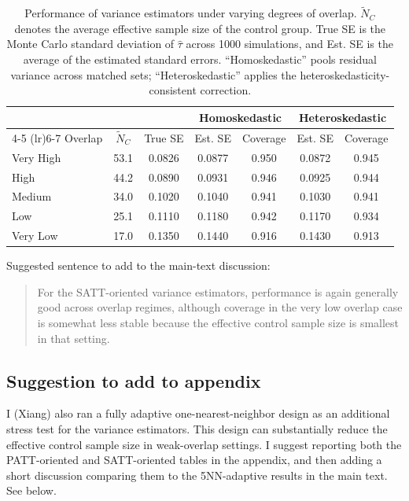 \documentclass[11pt]{article}
\begin{document}
\begin{table}[hbt!]
\centering
\begin{tabular}{lcccccc}
  \hline
  & & & \multicolumn{2}{c}{Homoskedastic} & \multicolumn{2}{c}{Heteroskedastic} \\
  \cmidrule(lr){4-5} \cmidrule(lr){6-7}
  Overlap & $\tilde{N}_C$ & True SE & Est. SE & Coverage & Est. SE & Coverage \\ 
  \hline
  Very High & 53.1 & 0.0826 & 0.0877 & 0.950 & 0.0872 & 0.945 \\ 
  High      & 44.2 & 0.0890 & 0.0931 & 0.946 & 0.0925 & 0.944 \\ 
  Medium    & 34.0 & 0.1020 & 0.1040 & 0.941 & 0.1030 & 0.941 \\ 
  Low       & 25.1 & 0.1110 & 0.1180 & 0.942 & 0.1170 & 0.934 \\ 
  Very Low  & 17.0 & 0.1350 & 0.1440 & 0.916 & 0.1430 & 0.913 \\ 
   \hline
\end{tabular}
\label{tab:toy_var_pooled_vs_het-V_E}
\caption{Performance of variance estimators under varying degrees of overlap. $\tilde{N}_C$ denotes the average effective sample size of the control group. True SE is the Monte Carlo standard deviation of $\hat{\tau}$ across 1000 simulations, and Est. SE is the average of the estimated standard errors. ``Homoskedastic'' pools residual variance across matched sets; ``Heteroskedastic'' applies the heteroskedasticity-consistent correction.}
\end{table}

Suggested sentence to add to the main-text discussion:
\begin{quote}
For the SATT-oriented variance estimators, performance is again generally good across overlap regimes, although coverage in the very low overlap case is somewhat less stable because the effective control sample size is smallest in that setting.
\end{quote}

\subsection{Suggestion to add to appendix}

I (Xiang) also ran a fully adaptive one-nearest-neighbor design as an additional stress test for the variance estimators. This design can substantially reduce the effective control sample size in weak-overlap settings. I suggest reporting both the PATT-oriented and SATT-oriented tables in the appendix, and then adding a short discussion comparing them to the 5NN-adaptive results in the main text. See below.
\end{document}
